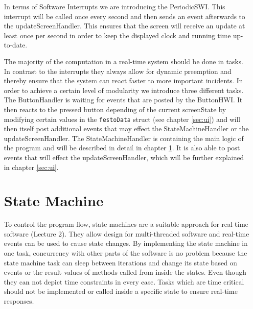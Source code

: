 In terms of Software Interrupts we are introducing the PeriodicSWI.
This interrupt will be called once every second and then sends an event afterwards to the updateScreenHandler.
This ensures that the screen will receive an update at least once per second in order to keep the displayed clock and running time up-to-date.

The majority of the computation in a real-time system should be done in tasks.
In contrast to the interrupts they always allow for dynamic preemption and thereby ensure that the system can react faster to more important incidents.
In order to achieve a certain level of modularity we introduce three different tasks.
The ButtonHandler is waiting for events that are posted by the ButtonHWI.
It then reacts to the pressed button depending of the current screenState by modifying certain values in the \texttt{festoData} struct (see chapter \ref{sec:ui}) and will then itself post additional events that may effect the StateMachineHandler or the updateScreenHandler.
The StateMachineHandler is containing the main logic of the program and will be described in detail in chapter \ref{ch:stateMachine}.
It is also able to post events that will effect the updateScreenHandler, which will be further explained in chapter \ref{sec:ui}.


\section{State Machine} \label{ch:stateMachine}%
To control the program flow, state machines are a suitable approach for real-time software (Lecture 2). They allow design for multi-threaded software and real-time events can be used to cause state changes. By implementing the state machine in one task, concurrency with other parts of the software is no problem because the state machine task can sleep between iterations and change its state based on events or the result values of methods called from inside the states. Even though they can not depict time constraints in every case. Tasks which are time critical should not be implemented or called inside a specific state to ensure real-time responses.

